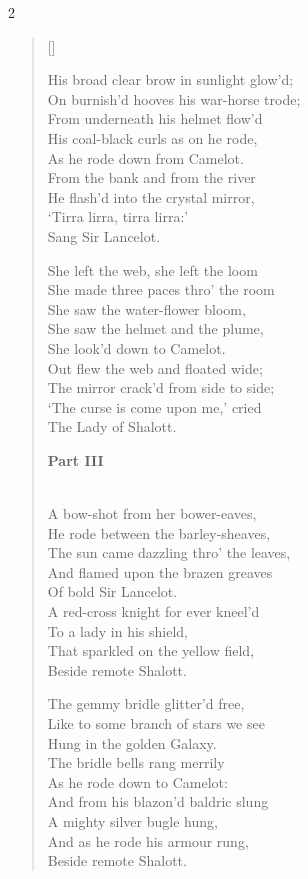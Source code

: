 \begin{paracol}{2}
\begin{verse}[\versewidth]
\begin{patverse}
His broad clear brow in sunlight glow'd;\\
On burnish'd hooves his war-horse trode;\\
From underneath his helmet flow'd\\
His coal-black curls as on he rode,\\
As he rode down from Camelot.\\
From the bank and from the river\\
He flash'd into the crystal mirror,\\
`Tirra lirra, tirra lirra:'\\
Sang Sir Lancelot.
\end{patverse}

\begin{patverse}
She left the web, she left the loom\\
She made three paces thro' the room\\
She saw the water-flower bloom,\\
She saw the helmet and the plume,\\
She look'd down to Camelot.\\
Out flew the web and floated wide;\\
The mirror crack'd from side to side;\\
`The curse is come upon me,' cried\\
The Lady of Shalott.\end{patverse}  \switchcolumn

\textbf{Part III}
\begin{patverse}
\phantom{.}\\
A bow-shot from her bower-eaves,\\
He rode between the barley-sheaves,\\
The sun came dazzling thro' the leaves,\\
And flamed upon the brazen greaves\\
Of bold Sir Lancelot.\\
A red-cross knight for ever kneel'd\\
To a lady in his shield,\\
That sparkled on the yellow field,\\
Beside remote Shalott.
\end{patverse}

\begin{patverse}
The gemmy bridle glitter'd free,\\
Like to some branch of stars we see\\
Hung in the golden Galaxy.\\
The bridle bells rang merrily\\
As he rode down to Camelot:\\
And from his blazon'd baldric slung\\
A mighty silver bugle hung,\\
And as he rode his armour rung,\\
Beside remote Shalott.
\end{patverse}


\end{verse}
\end{paracol}
